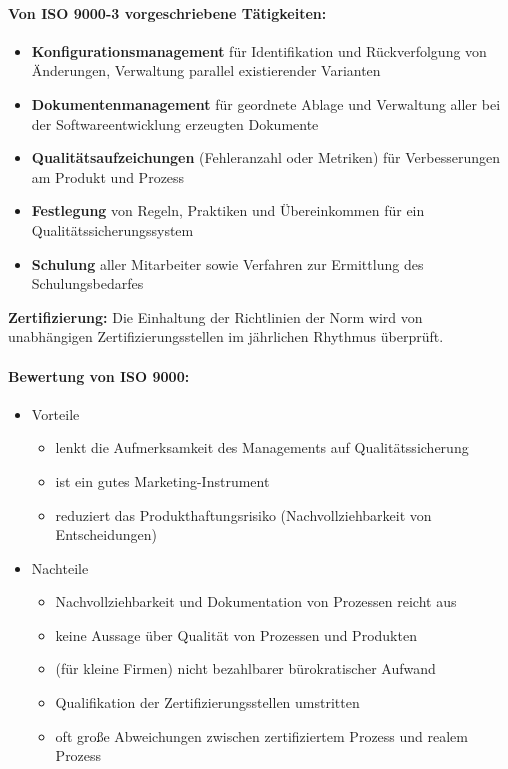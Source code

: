 \paragraph{Von ISO 9000-3 vorgeschriebene Tätigkeiten:}
\begin{itemize}
	\item \textbf{Konfigurationsmanagement} für Identifikation und Rückverfolgung von Änderungen, Verwaltung parallel existierender Varianten
	\item \textbf{Dokumentenmanagement} für geordnete Ablage und Verwaltung aller bei der Softwareentwicklung erzeugten Dokumente
	\item \textbf{Qualitätsaufzeichungen} (Fehleranzahl oder Metriken) für Verbesserungen am Produkt und Prozess
	\item \textbf{Festlegung} von Regeln, Praktiken und Übereinkommen für ein Qualitätssicherungssystem
	\item \textbf{Schulung} aller Mitarbeiter sowie Verfahren zur Ermittlung des Schulungsbedarfes
\end{itemize}
\textbf{Zertifizierung:} Die Einhaltung der Richtlinien der Norm wird von unabhängigen Zertifizierungsstellen im jährlichen Rhythmus überprüft.

\paragraph{Bewertung von ISO 9000:}
\begin{itemize}
	\item Vorteile
	\begin{itemize}
		\item lenkt die Aufmerksamkeit des Managements auf Qualitätssicherung
		\item ist ein gutes Marketing-Instrument
		\item reduziert das Produkthaftungsrisiko (Nachvollziehbarkeit von Entscheidungen)
	\end{itemize}
	\item Nachteile
	\begin{itemize}
		\item Nachvollziehbarkeit und Dokumentation von Prozessen reicht aus
		\item keine Aussage über Qualität von Prozessen und Produkten
		\item (für kleine Firmen) nicht bezahlbarer bürokratischer Aufwand
		\item Qualifikation der Zertifizierungsstellen umstritten
		\item oft große Abweichungen zwischen zertifiziertem Prozess und realem Prozess
	\end{itemize}
\end{itemize}


